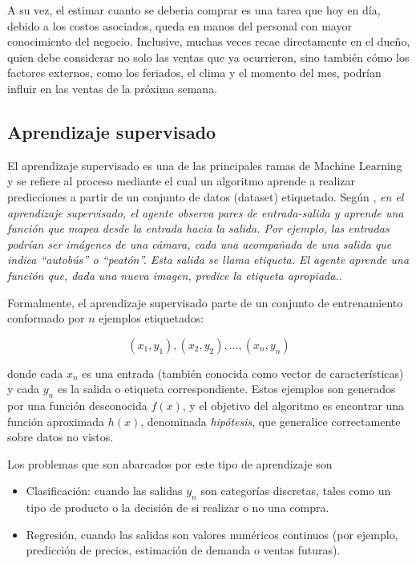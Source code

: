 A su vez, el estimar cuanto se deberia comprar es una tarea que hoy en día, debido a los costos asociados, queda en manos del personal con mayor conocimiento del negocio. Inclusive, muchas veces recae directamente en el dueño, quien debe considerar no solo las ventas que ya ocurrieron, sino también cómo los factores externos, como los feriados, el clima y el momento del mes, podrían influir en las ventas de la próxima semana.

\subsection{Aprendizaje supervisado}

El aprendizaje supervisado es una de las principales ramas de Machine Learning y se refiere al proceso mediante el cual un algoritmo aprende a realizar predicciones a partir de un conjunto de datos (dataset) etiquetado. Según \parencite{russell2022ai}, \guillemotleft{}\emph{en el aprendizaje supervisado, el agente observa pares de entrada-salida y aprende una función que mapea desde la entrada hacia la salida. Por ejemplo, las entradas podrían ser imágenes de una cámara, cada una acompañada de una salida que indica \textquotedblleft autobús\textquotedblright{} o \textquotedblleft peatón\textquotedblright{}. Esta salida se llama etiqueta. El agente aprende una función que, dada una nueva imagen, predice la etiqueta apropiada.}\guillemotright{}.

Formalmente, el aprendizaje supervisado parte de un conjunto de entrenamiento conformado por $n$ ejemplos etiquetados:

\[(x_1, y_1), (x_2, y_2), \ldots, (x_n, y_n)\]

\noindent donde cada $x_n$ es una entrada (también conocida como vector de características) y cada $y_n$ es la salida o etiqueta correspondiente. Estos ejemplos son generados por una función desconocida $f(x)$, y el objetivo del algoritmo es encontrar una función aproximada $h(x)$, denominada \emph{hipótesis}, que generalice correctamente sobre datos no vistos.

Los problemas que son abarcados por este tipo de aprendizaje son

 \begin{itemize}
    \item Clasificación: cuando las salidas $y_n$ son categorías discretas, tales como un tipo de producto o la decisión de si realizar o no una compra.

    \item Regresión, cuando las salidas son valores numéricos continuos (por ejemplo, predicción de precios, estimación de demanda o ventas futuras).
\end{itemize}

